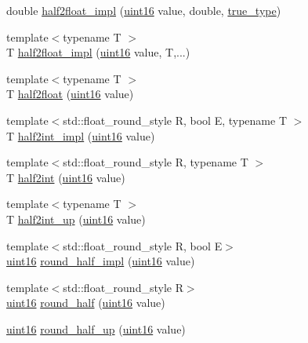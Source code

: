 \begin{Indent}
\begin{DoxyCompactItemize}
\item 
double \hyperlink{namespacehalf__float_1_1detail_aaf774221cb784d97cb9fdf0edc1a76f3}{half2float\+\_\+impl} (\hyperlink{namespacehalf__float_1_1detail_a239ec58092b4e4849b444baee1a01088}{uint16} value, double, \hyperlink{namespacehalf__float_1_1detail_a5e245748a3cc20e348dd92383d99d03c}{true\+\_\+type})
\item 
{\footnotesize template$<$typename T $>$ }\\T \hyperlink{namespacehalf__float_1_1detail_afe86dfbf3a3bac81cfe88aaec27969c1}{half2float\+\_\+impl} (\hyperlink{namespacehalf__float_1_1detail_a239ec58092b4e4849b444baee1a01088}{uint16} value, T,...)
\item 
{\footnotesize template$<$typename T $>$ }\\T \hyperlink{namespacehalf__float_1_1detail_aacbda37363295f0d13fca10c223e8169}{half2float} (\hyperlink{namespacehalf__float_1_1detail_a239ec58092b4e4849b444baee1a01088}{uint16} value)
\item 
{\footnotesize template$<$std\+::float\+\_\+round\+\_\+style R, bool E, typename T $>$ }\\T \hyperlink{namespacehalf__float_1_1detail_a93c7f040e64b7cedad971b42bedc85a2}{half2int\+\_\+impl} (\hyperlink{namespacehalf__float_1_1detail_a239ec58092b4e4849b444baee1a01088}{uint16} value)
\item 
{\footnotesize template$<$std\+::float\+\_\+round\+\_\+style R, typename T $>$ }\\T \hyperlink{namespacehalf__float_1_1detail_a78bf248e5c07c8b73adbb0986b430675}{half2int} (\hyperlink{namespacehalf__float_1_1detail_a239ec58092b4e4849b444baee1a01088}{uint16} value)
\item 
{\footnotesize template$<$typename T $>$ }\\T \hyperlink{namespacehalf__float_1_1detail_a1672f8be699238543caa56fc43ed17ee}{half2int\+\_\+up} (\hyperlink{namespacehalf__float_1_1detail_a239ec58092b4e4849b444baee1a01088}{uint16} value)
\item 
{\footnotesize template$<$std\+::float\+\_\+round\+\_\+style R, bool E$>$ }\\\hyperlink{namespacehalf__float_1_1detail_a239ec58092b4e4849b444baee1a01088}{uint16} \hyperlink{namespacehalf__float_1_1detail_ab4e14ce718b27e88bd319bbac32b6d1c}{round\+\_\+half\+\_\+impl} (\hyperlink{namespacehalf__float_1_1detail_a239ec58092b4e4849b444baee1a01088}{uint16} value)
\item 
{\footnotesize template$<$std\+::float\+\_\+round\+\_\+style R$>$ }\\\hyperlink{namespacehalf__float_1_1detail_a239ec58092b4e4849b444baee1a01088}{uint16} \hyperlink{namespacehalf__float_1_1detail_ad83f9ae057a78ad84ac6a35a3f9b5509}{round\+\_\+half} (\hyperlink{namespacehalf__float_1_1detail_a239ec58092b4e4849b444baee1a01088}{uint16} value)
\item 
\hyperlink{namespacehalf__float_1_1detail_a239ec58092b4e4849b444baee1a01088}{uint16} \hyperlink{namespacehalf__float_1_1detail_ab00a3fec9c3b3d27d5957c85ae5b587b}{round\+\_\+half\+\_\+up} (\hyperlink{namespacehalf__float_1_1detail_a239ec58092b4e4849b444baee1a01088}{uint16} value)
\end{DoxyCompactItemize}
\end{Indent}
